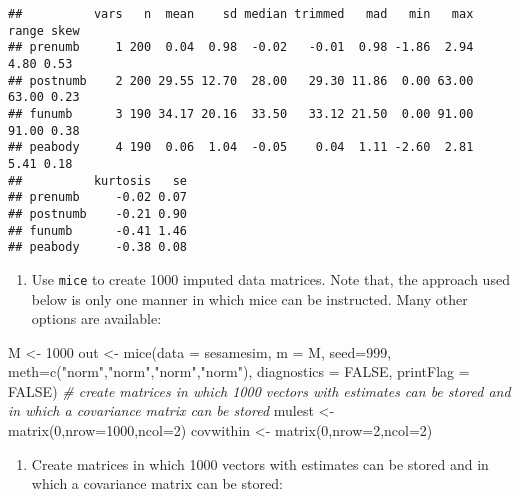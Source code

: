 \documentclass[
]{book}
\newenvironment{Shaded}{\begin{snugshade}}{\end{snugshade}}
\newcommand{\AttributeTok}[1]{\textcolor[rgb]{0.77,0.63,0.00}{#1}}
\newcommand{\CommentTok}[1]{\textcolor[rgb]{0.56,0.35,0.01}{\textit{#1}}}
\newcommand{\ConstantTok}[1]{\textcolor[rgb]{0.00,0.00,0.00}{#1}}
\newcommand{\DecValTok}[1]{\textcolor[rgb]{0.00,0.00,0.81}{#1}}
\newcommand{\FunctionTok}[1]{\textcolor[rgb]{0.00,0.00,0.00}{#1}}
\newcommand{\NormalTok}[1]{#1}
\newcommand{\OtherTok}[1]{\textcolor[rgb]{0.56,0.35,0.01}{#1}}
\newcommand{\StringTok}[1]{\textcolor[rgb]{0.31,0.60,0.02}{#1}}
\providecommand{\tightlist}{%
  \setlength{\itemsep}{0pt}\setlength{\parskip}{0pt}}
\begin{document}
\begin{verbatim}
##          vars   n  mean    sd median trimmed   mad   min   max range skew
## prenumb     1 200  0.04  0.98  -0.02   -0.01  0.98 -1.86  2.94  4.80 0.53
## postnumb    2 200 29.55 12.70  28.00   29.30 11.86  0.00 63.00 63.00 0.23
## funumb      3 190 34.17 20.16  33.50   33.12 21.50  0.00 91.00 91.00 0.38
## peabody     4 190  0.06  1.04  -0.05    0.04  1.11 -2.60  2.81  5.41 0.18
##          kurtosis   se
## prenumb     -0.02 0.07
## postnumb    -0.21 0.90
## funumb      -0.41 1.46
## peabody     -0.38 0.08
\end{verbatim}

\begin{enumerate}
\def\labelenumi{\arabic{enumi})}
\tightlist
\item
  Use \texttt{mice} to create 1000 imputed data matrices. Note that, the approach used
  below is only one manner in which mice can be instructed. Many other options are available:
\end{enumerate}

\begin{Shaded}
\begin{Highlighting}[]
\NormalTok{M }\OtherTok{\textless{}{-}} \DecValTok{1000} 
\NormalTok{out }\OtherTok{\textless{}{-}} \FunctionTok{mice}\NormalTok{(}\AttributeTok{data =}\NormalTok{ sesamesim, }\AttributeTok{m =}\NormalTok{ M, }\AttributeTok{seed=}\DecValTok{999}\NormalTok{, }\AttributeTok{meth=}\FunctionTok{c}\NormalTok{(}\StringTok{"norm"}\NormalTok{,}\StringTok{"norm"}\NormalTok{,}\StringTok{"norm"}\NormalTok{,}\StringTok{"norm"}\NormalTok{), }\AttributeTok{diagnostics =} \ConstantTok{FALSE}\NormalTok{, }\AttributeTok{printFlag =} \ConstantTok{FALSE}\NormalTok{)}
\CommentTok{\# create matrices in which 1000 vectors with estimates can be stored and in which a covariance matrix can be stored}
\NormalTok{mulest }\OtherTok{\textless{}{-}} \FunctionTok{matrix}\NormalTok{(}\DecValTok{0}\NormalTok{,}\AttributeTok{nrow=}\DecValTok{1000}\NormalTok{,}\AttributeTok{ncol=}\DecValTok{2}\NormalTok{)}
\NormalTok{covwithin }\OtherTok{\textless{}{-}} \FunctionTok{matrix}\NormalTok{(}\DecValTok{0}\NormalTok{,}\AttributeTok{nrow=}\DecValTok{2}\NormalTok{,}\AttributeTok{ncol=}\DecValTok{2}\NormalTok{)}
\end{Highlighting}
\end{Shaded}

\begin{enumerate}
\def\labelenumi{\arabic{enumi})}
\setcounter{enumi}{1}
\tightlist
\item
  Create matrices in which 1000 vectors with estimates can be stored and in which a covariance matrix can be stored:
\end{enumerate}
\end{document}

